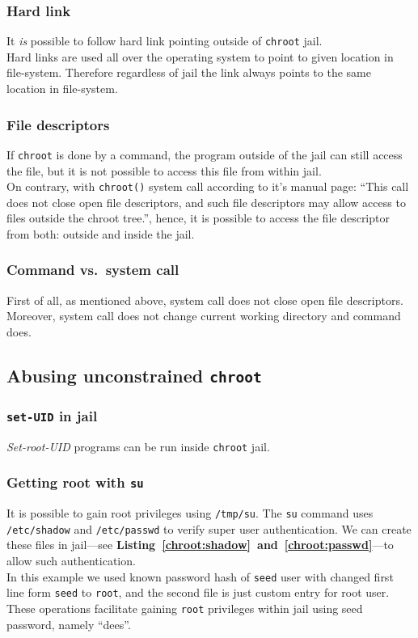 \documentclass[12pt, a4paper, pdflatex]{article}
\begin{document}
\subsubsection{Hard link}
It \emph{is} possible to follow hard link pointing outside of \texttt{chroot} jail.\\
Hard links are used all over the operating system to point to given location in file-system. Therefore regardless of jail the link always points to the same location in file-system.

\subsubsection{File descriptors}
If \texttt{chroot} is done by a command, the program outside of the jail can still access the file, but it is not possible to access this file from within jail.\\
On contrary, with \texttt{chroot()} system call according to it's manual page: ``This call does not close open file descriptors, and such file descriptors may allow access to files outside the chroot tree.'', hence, it is possible to access the file descriptor from both: outside and inside the jail.

\subsubsection{Command vs.\ system call}
First of all, as mentioned above, system call does not close open file descriptors. Moreover, system call does not change current working directory and command does.

\subsection{Abusing unconstrained \texttt{chroot}}
\subsubsection{\texttt{set-UID} in jail}
\emph{Set-root-UID} programs can be run inside \texttt{chroot} jail.

\subsubsection{Getting root with \texttt{su}}
It is possible to gain root privileges using \texttt{/tmp/su}. The \texttt{su} command uses \texttt{/etc/shadow} and \texttt{/etc/passwd} to verify super user authentication. We can create these files in jail---see \textbf{Listing~\ref{chroot:shadow}~and~\ref{chroot:passwd}}---to allow such authentication.\\
In this example we used known password hash of \texttt{seed} user with changed first line form \texttt{seed} to \texttt{root}, and the second file is just custom entry for root user.\\
These operations facilitate gaining \texttt{root} privileges within jail using seed password, namely ``dees''.
\end{document}
